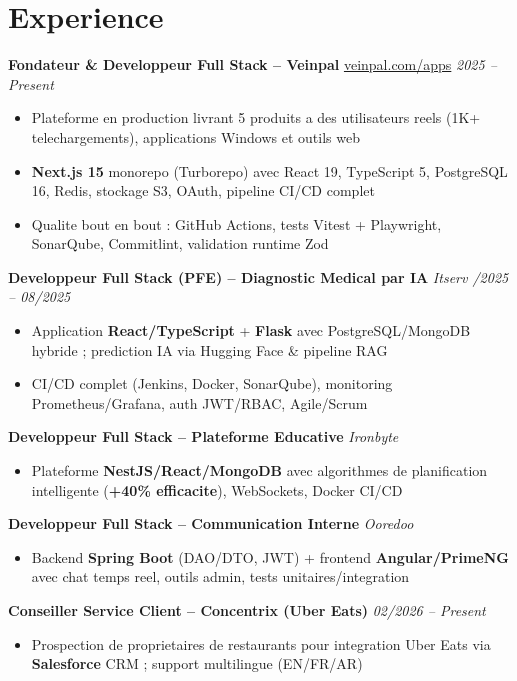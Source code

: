 \documentclass[10pt,a4paper]{article}
\begin{document}
\section*{Experience}
{\small

\textbf{Fondateur \& Developpeur Full Stack -- Veinpal} \hfill \href{https://veinpal.com/apps}{veinpal.com/apps} \;\textbar\; \textit{2025 -- Present}
\begin{itemize}
  \item Plateforme en production livrant 5 produits a des utilisateurs reels (1K+ telechargements), applications Windows et outils web
  \item \textbf{Next.js 15} monorepo (Turborepo) avec React 19, TypeScript 5, PostgreSQL 16, Redis, stockage S3, OAuth, pipeline CI/CD complet
  \item Qualite bout en bout : GitHub Actions, tests Vitest + Playwright, SonarQube, Commitlint, validation runtime Zod
\end{itemize}

\vspace{2pt}
\textbf{Developpeur Full Stack (PFE) -- Diagnostic Medical par IA} \hfill \textit{Itserv \;\textbar{}/2025 -- 08/2025}
\begin{itemize}
  \item Application \textbf{React/TypeScript} + \textbf{Flask} avec PostgreSQL/MongoDB hybride ; prediction IA via Hugging Face \& pipeline RAG
  \item CI/CD complet (Jenkins, Docker, SonarQube), monitoring Prometheus/Grafana, auth JWT/RBAC, Agile/Scrum
\end{itemize}

\vspace{2pt}
\textbf{Developpeur Full Stack -- Plateforme Educative} \hfill \textit{Ironbyte \;\textbar{}}
\begin{itemize}
  \item Plateforme \textbf{NestJS/React/MongoDB} avec algorithmes de planification intelligente (\textbf{+40\% efficacite}), WebSockets, Docker CI/CD
\end{itemize}

\vspace{2pt}
\textbf{Developpeur Full Stack -- Communication Interne} \hfill \textit{Ooredoo \;\textbar{}}
\begin{itemize}
  \item Backend \textbf{Spring Boot} (DAO/DTO, JWT) + frontend \textbf{Angular/PrimeNG} avec chat temps reel, outils admin, tests unitaires/integration
\end{itemize}

\vspace{2pt}
\textbf{Conseiller Service Client -- Concentrix (Uber Eats)} \hfill \textit{02/2026 -- Present}
\begin{itemize}
  \item Prospection de proprietaires de restaurants pour integration Uber Eats via \textbf{Salesforce} CRM ; support multilingue (EN/FR/AR)
\end{itemize}

}
\end{document}
